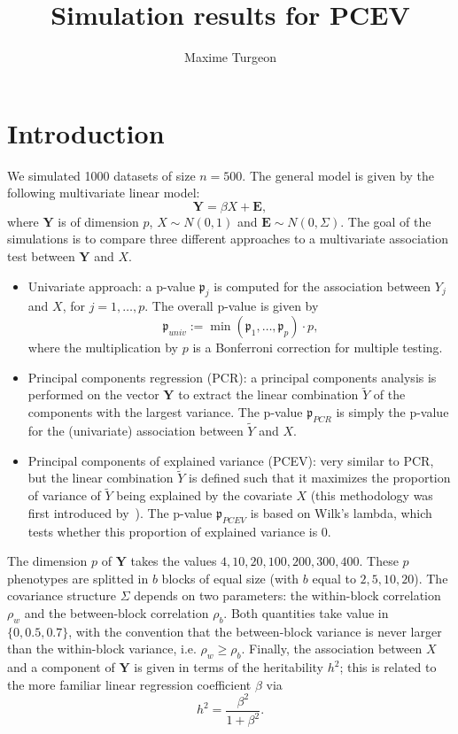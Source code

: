 \documentclass[11pt,letter]{article}\usepackage[]{graphicx}\usepackage[]{color}
\begin{document}
\pagestyle{fancy}

\title{Simulation results for PCEV}
\author{Maxime Turgeon}
\maketitle






\tableofcontents

\section*{Introduction}

We simulated 1000 datasets of size $n=500$. The general model is given by the following multivariate linear model:
$$\mathbf{Y} = \beta X + \mathbf{E},$$
where $\mathbf{Y}$ is of dimension $p$, $X\sim N(0,1)$ and $\mathbf{E}\sim N(0,\Sigma)$. The goal of the simulations is to compare three different approaches to a multivariate association test between $\mathbf{Y}$ and $X$.
\begin{itemize}
  \item Univariate approach: a p-value $\mathfrak{p}_j$ is computed for the association between $Y_j$ and $X$, for $j=1,\ldots,p$. The overall p-value is given by
  $$\mathfrak{p}_{univ} := \min(\mathfrak{p}_1,\ldots,\mathfrak{p}_p)\cdot p,$$
  where the multiplication by $p$ is a Bonferroni correction for multiple testing.
  \item Principal components regression (PCR): a principal components analysis is performed on the vector $\mathbf{Y}$ to extract the linear combination $\tilde{Y}$ of the components with the largest variance. The p-value $\mathfrak{p}_{PCR}$ is simply the p-value for the (univariate) association between $\tilde{Y}$ and $X$.
  \item Principal components of explained variance (PCEV): very similar to PCR, but the linear combination $\tilde{Y}$ is defined such that it maximizes the proportion of variance of $\tilde{Y}$ being explained by the covariate $X$ (this methodology was first introduced by~\cite{ott1999principal}). The p-value $\mathfrak{p}_{PCEV}$ is based on Wilk's lambda, which tests whether this proportion of explained variance is 0.
\end{itemize}

The dimension $p$ of $\mathbf{Y}$ takes the values $4,10,20,100,200,300,400$. These $p$ phenotypes are splitted in $b$ blocks of equal size (with $b$ equal to $2,5,10,20$). The covariance structure $\Sigma$ depends on two parameters: the within-block correlation $\rho_w$ and the between-block correlation $\rho_b$. Both quantities take value in $\{0, 0.5, 0.7\}$, with the convention that the between-block variance is never larger than the within-block variance, i.e. $\rho_w \geq \rho_b$. Finally, the association between $X$ and a component of $\mathbf{Y}$ is given in terms of the heritability $h^2$; this is related to the more familiar linear regression coefficient $\beta$ via
$$h^2=\frac{\beta^2}{1 + \beta^2}.$$
\end{document}

